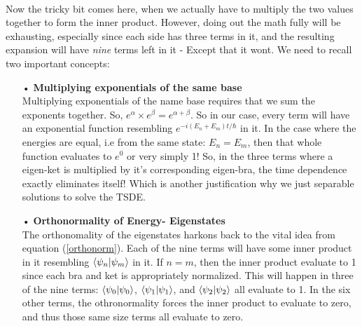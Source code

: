 \documentclass[12pt,letterpaper]{book}
\begin{document}
\paragraph*{}Now the tricky bit comes here, when we actually have to multiply the two values together to form the inner product. However, doing out the math fully will be exhausting, especially since each side has three terms in it, and the resulting expansion will have \textit{nine} terms left in it - Except that it wont. We need to recall two important concepts:

\begin{enumerate}
\item[•]\textbf{Multiplying exponentials of the same base}\\
Multiplying exponentials of the name base requires that we sum the exponents together. So, $e^{\alpha} \times e^{\beta} = e^{\alpha + \beta}$. So in our case, every term will have an exponential function resembling $e^{-i(E_n + E_m)t/\hbar}$ in it. In the case where the energies are equal, i.e from the same state: $E_n = E_m$, then that whole function evaluates to $e^0$ or very simply 1! So, in the three terms where a eigen-ket is multiplied by it's corresponding eigen-bra, the time dependence exactly eliminates itself! Which is another justification why we just separable solutions to solve the TSDE. 
\item[•]\textbf{Orthonormality of Energy- Eigenstates}\\
The orthonomality of the eigenstates harkons back to the vital idea from equation (\ref{orthonorm}). Each of the nine terms will have some inner product in it resembling $\braket{\psi_n}{\psi_m}$ in it. If $n = m$, then the inner product evaluate to 1 since each bra and ket is appropriately normalized. This will happen in three of the nine terms: $\braket{\psi_0}{\psi_0}$, $\braket{\psi_1}{\psi_1}$, and 
$\braket{\psi_2}{\psi_2}$ all  evaluate to 1.  In the six other terms, the othronormality forces the inner product to evaluate to zero, and thus those same size terms all evaluate to zero.
\end{enumerate}
\end{document}
